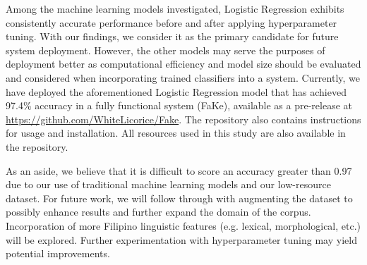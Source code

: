 Among the machine learning models investigated, Logistic Regression exhibits consistently accurate performance before and after applying hyperparameter tuning. With our findings, we consider it as the primary candidate for future system deployment. However, the other models may serve the purposes of deployment better as computational efficiency and model size should be evaluated and considered when incorporating trained classifiers into a system. Currently, we have deployed the aforementioned Logistic Regression model that has achieved 97.4\% accuracy in a fully functional system (FaKe), available as a pre-release at \url{https://github.com/WhiteLicorice/Fake}. The repository also contains instructions for usage and installation. All resources used in this study are also available in the repository.

As an aside, we believe that it is difficult to score an accuracy greater than 0.97 due to our use of traditional machine learning models and our low-resource dataset. For future work, we will follow through with augmenting the dataset to possibly enhance results and further expand the domain of the corpus. Incorporation of more Filipino linguistic features (e.g. lexical, morphological, etc.) will be explored. Further experimentation with hyperparameter tuning may yield potential improvements.